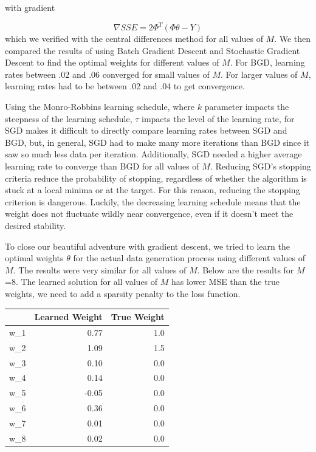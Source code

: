 \documentclass[10pt]{article}
\begin{document}
with gradient 

\begin{equation*}
	\nabla SSE = 2\Phi^T(\Phi \theta-Y)
\end{equation*}
 which we verified with the central differences method for all values of $M$. We then compared the results of using Batch Gradient Descent and Stochastic Gradient Descent to find the optimal weights for different values of $M$. For BGD, learning rates between .02 and .06 converged for small values of $M$. For larger values of $M$,  learning rates had to be between .02 and .04 to get convergence.
 
 Using the Monro-Robbins learning schedule, where $k$ parameter impacts the steepness of the learning schedule, $\tau$ impacts the level of the learning rate, for SGD makes it difficult to directly compare learning rates between SGD and BGD, but, in general, SGD had to make many more iterations than BGD since it saw so much less data per iteration. Additionally, SGD needed a higher average learning rate to converge than BGD for all values of $M$.
 Reducing SGD's stopping criteria reduce the probability of stopping, regardless of whether the algorithm is stuck at a local minima or at the target. For this reason, reducing the stopping criterion is dangerous. Luckily, the decreasing learning schedule means that the weight does not fluctuate wildly near convergence, even if it doesn't meet the desired stability. 
 

To close our beautiful adventure with gradient descent, we tried to learn the optimal weights $\theta$ for the actual data generation process using different values of $M$. The results were very similar for all values of $M$. Below are the results for $M$=8.  The learned solution for all values of $M$ has lower MSE than the true weights,  we need to add a sparsity penalty to the loss function.

\begin{centering}
\begin{table}

\begin{tabular}{lrr}
\toprule
{} &  Learned Weight &  True Weight \\
\midrule
w\_1 &            0.77 &          1.0 \\
w\_2 &            1.09 &          1.5 \\
w\_3 &            0.10 &          0.0 \\
w\_4 &            0.14 &          0.0 \\
w\_5 &           -0.05 &          0.0 \\
w\_6 &            0.36 &          0.0 \\
w\_7 &            0.01 &          0.0 \\
w\_8 &            0.02 &          0.0 \\
\bottomrule
\end{tabular}

\end{table}
\end{centering}
\end{document}
